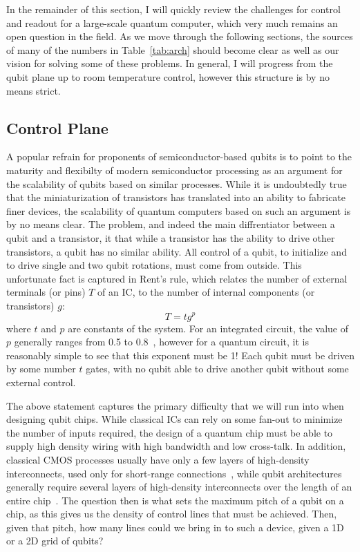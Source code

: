In the remainder of this section, I will quickly review the challenges for control and readout for a large-scale quantum computer, which very much remains
an open question in the field. As we move through the following sections, the sources of many of the numbers in Table~\ref{tab:arch} should become clear
as well as our vision for solving some of these problems. In general, I will progress from the qubit plane up to room temperature control, however this
structure is by no means strict.

\subsection{Control Plane}
\label{sec:control}
A popular refrain for proponents of semiconductor-based qubits is to point to the maturity and flexibilty of modern semiconductor processing as an argument
for the scalability of qubits based on similar processes. While it is undoubtedly true that the miniaturization of transistors has translated into an ability
to fabricate finer devices, the scalability of quantum computers based on such an argument is by no means clear. The problem, and indeed the main diffrentiator
between a qubit and a transistor, it that while a transistor has the ability to drive other transistors, a qubit has no similar ability. All control of a qubit,
to initialize and to drive single and two qubit rotations, must come from outside. This unfortunate fact is captured in Rent's rule, which relates the number of
external terminals (or pins) $T$ of an IC, to the number of internal components (or transistors) $g$:
\begin{equation}
  T = tg^p
  \label{eq:rent}
\end{equation}
where $t$ and $p$ are constants of the system. For an integrated circuit, the value of $p$ generally ranges from 0.5 to 0.8~\cite{5388820}, however for a quantum
circuit, it is reasonably simple to see that this exponent must be 1! Each qubit must be driven by some number $t$ gates, with no qubit able to drive another
qubit without some external control.

The above statement captures the primary difficulty that we will run into when designing qubit chips. While classical ICs can rely on some fan-out to minimize
the number of inputs required, the design of a quantum chip must be able to supply high density wiring with high bandwidth and low cross-talk. In addition,
classical CMOS processes usually have only a few layers of high-density interconnects, used only for short-range connections~\cite{5424258}, while qubit
architectures generally require several layers of high-density interconnects over the length of an entire chip~\cite{s41467-017-01905-6}. The question then is
what sets the maximum pitch of a qubit on a chip, as this gives us the density of control lines that must be achieved. Then, given that pitch, how many lines could
we bring in to such a device, given a 1D or a 2D grid of qubits?

